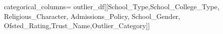\documentclass[
  letterpaper,
  DIV=11,
  numbers=noendperiod]{scrartcl}
\newenvironment{Shaded}{\begin{snugshade}}{\end{snugshade}}
\newcommand{\NormalTok}[1]{\textcolor[rgb]{0.00,0.23,0.31}{#1}}
\newcommand{\OperatorTok}[1]{\textcolor[rgb]{0.37,0.37,0.37}{#1}}
\newcommand{\StringTok}[1]{\textcolor[rgb]{0.13,0.47,0.30}{#1}}
\begin{document}
\begin{Shaded}
\begin{Highlighting}[]
\NormalTok{categorical\_columns}\OperatorTok{=}\NormalTok{ outlier\_df[[}\StringTok{\textquotesingle{}School\_Type\textquotesingle{}}\NormalTok{,}\StringTok{\textquotesingle{}School\_College\_Type\textquotesingle{}}\NormalTok{,}
\StringTok{\textquotesingle{}Religious\_Character\textquotesingle{}}\NormalTok{,}
\StringTok{\textquotesingle{}Admissions\_Policy\textquotesingle{}}\NormalTok{,}
 \StringTok{\textquotesingle{}School\_Gender\textquotesingle{}}\NormalTok{,}
\StringTok{\textquotesingle{}Ofsted\_Rating\textquotesingle{}}\NormalTok{,}\StringTok{\textquotesingle{}Trust\_Name\textquotesingle{}}\NormalTok{,}\StringTok{\textquotesingle{}Outlier\_Category\textquotesingle{}}\NormalTok{]]}
                                             
\end{Highlighting}
\end{Shaded}
\end{document}
